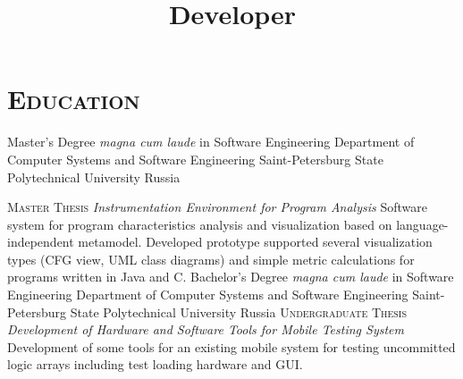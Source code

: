 \documentclass[12pt,a4paper]{moderncv}
\title     {Developer}
\begin{document}

\let\ssection\section
\renewcommand{\section}[1]{\vspace*{-2ex}\ssection{#1}}

\maketitle

\section{\textsc{Education}}
%
        {Master's Degree \textit{magna cum laude} in Software Engineering}
        {Department of Computer Systems and Software Engineering}
        {Saint-Petersburg State Polytechnical University}
        {Russia}{}

%
\cvitem{---}
       {\textsc{Master Thesis}}
       {\emph{Instrumentation Environment for Program Analysis}}
       {\small Software system for program characteristics analysis and
       visualization based on language-independent metamodel. Developed
       prototype supported several visualization types (CFG view, UML class
       diagrams) and simple metric calculations for programs written in Java and C.}
%
        {Bachelor's Degree \textit{magna cum laude} in Software Engineering}
        {Department of Computer Systems and Software Engineering}
        {Saint-Petersburg State Polytechnical University}
        {Russia}{}
%
\cvitem{---}
       {\textsc{Undergraduate Thesis}}
       {\emph{Development of Hardware and Software Tools for Mobile Testing System}}
       {\small Development of some tools for an existing mobile system for
       testing uncommitted logic arrays including test loading hardware and GUI.}

\end{document}
